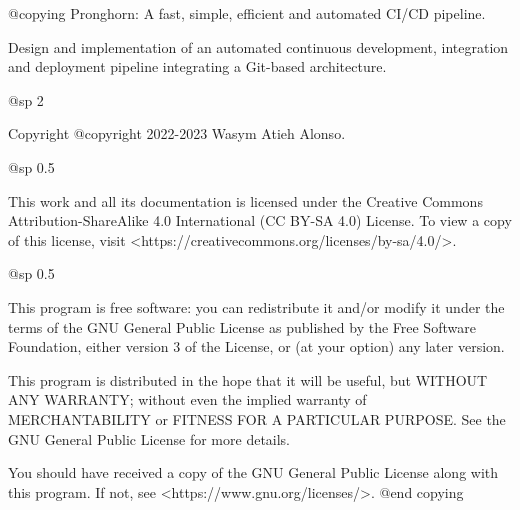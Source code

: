 @copying
Pronghorn: A fast, simple, efficient and automated CI/CD pipeline.

Design and implementation of an automated continuous development, integration and deployment pipeline integrating a Git-based architecture.

@sp 2

Copyright @copyright{} 2022-2023 Wasym Atieh Alonso.

@sp 0.5

This work and all its documentation is licensed under the Creative Commons Attribution-ShareAlike 4.0 International (CC BY-SA 4.0) License. To view a copy of this license, visit <https://creativecommons.org/licenses/by-sa/4.0/>.

@sp 0.5

This program is free software: you can redistribute it and/or modify it under the terms of the GNU General Public License as published by the Free Software Foundation, either version 3 of the License, or (at your option) any later version.

This program is distributed in the hope that it will be useful, but WITHOUT ANY WARRANTY; without even the implied warranty of MERCHANTABILITY or FITNESS FOR A PARTICULAR PURPOSE. See the GNU General Public License for more details.

You should have received a copy of the GNU General Public License along with this program. If not, see <https://www.gnu.org/licenses/>.
@end copying
